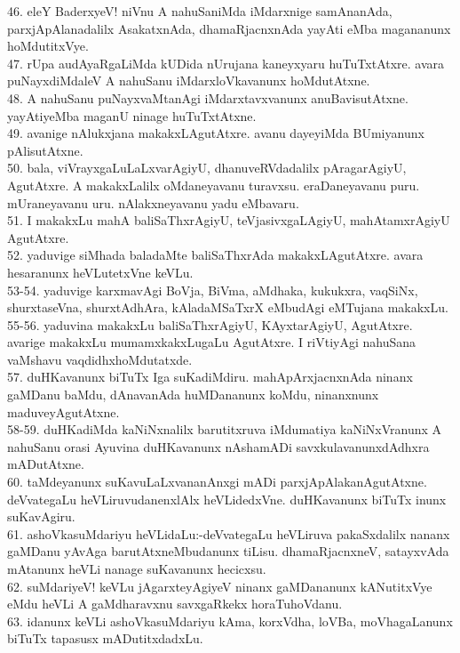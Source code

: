\documentclass{article}
\begin{document}
46. eleY BaderxyeV! niVnu A nahuSaniMda iMdarxnige samAnanAda, parxjApAlanadalilx AsakatxnAda, dhamaRjacnxnAda yayAti eMba magananunx hoMdutitxVye.\\
47. rUpa audAyaRgaLiMda kUDida nUrujana kaneyxyaru huTuTxtAtxre. avara puNayxdiMdaleV A nahuSanu iMdarxloVkavanunx hoMdutAtxne.\\
48. A nahuSanu puNayxvaMtanAgi iMdarxtavxvanunx anuBavisutAtxne. yayAtiyeMba maganU ninage huTuTxtAtxne.\\
49. avanige nAlukxjana makakxLAgutAtxre. avanu dayeyiMda BUmiyanunx pAlisutAtxne.\\
50. bala, viVrayxgaLuLaLxvarAgiyU, dhanuveRVdadalilx pAragarAgiyU, AgutAtxre. A makakxLalilx oMdaneyavanu turavxsu. eraDaneyavanu puru. mUraneyavanu uru. nAlakxneyavanu yadu eMbavaru.\\
51. I makakxLu mahA baliSaThxrAgiyU, teVjasivxgaLAgiyU, mahAtamxrAgiyU AgutAtxre.\\
52. yaduvige siMhada baladaMte baliSaThxrAda makakxLAgutAtxre. avara hesaranunx heVLutetxVne keVLu.\\
53-54. yaduvige karxmavAgi BoVja, BiVma, aMdhaka, kukukxra, vaqSiNx, shurxtaseVna, shurxtAdhAra, kAladaMSaTxrX eMbudAgi eMTujana makakxLu.\\
55-56. yaduvina makakxLu baliSaThxrAgiyU, KAyxtarAgiyU, AgutAtxre. avarige makakxLu mumamxkakxLugaLu AgutAtxre. I riVtiyAgi nahuSana vaMshavu vaqdidhxhoMdutatxde.\\
57. duHKavanunx biTuTx Iga suKadiMdiru. mahApArxjacnxnAda ninanx gaMDanu baMdu, dAnavanAda huMDananunx koMdu, ninanxnunx maduveyAgutAtxne.\\
58-59. duHKadiMda kaNiNxnalilx barutitxruva iMdumatiya kaNiNxVranunx A nahuSanu orasi Ayuvina duHKavanunx nAshamADi savxkulavanunxdAdhxra mADutAtxne.\\
60. taMdeyanunx suKavuLaLxvananAnxgi mADi parxjApAlakanAgutAtxne. deVvategaLu heVLiruvudanenxlAlx heVLidedxVne. duHKavanunx biTuTx inunx suKavAgiru.\\
61. ashoVkasuMdariyu heVLidaLu:-deVvategaLu heVLiruva pakaSxdalilx nananx gaMDanu yAvAga barutAtxneMbudanunx tiLisu. dhamaRjacnxneV, satayxvAda mAtanunx heVLi nanage suKavanunx hecicxsu.\\
62. suMdariyeV! keVLu jAgarxteyAgiyeV ninanx gaMDananunx kANutitxVye eMdu heVLi A gaMdharavxnu savxgaRkekx horaTuhoVdanu.\\
63. idanunx keVLi ashoVkasuMdariyu kAma, korxVdha, loVBa, moVhagaLanunx biTuTx tapasusx mADutitxdadxLu.
\end{document}
